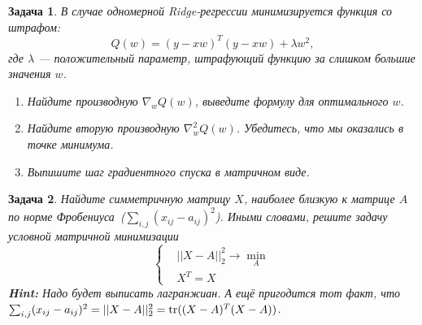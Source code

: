 \documentclass[12pt,fleqn]{article}
\newtheorem{esProblem}{Задача}
\begin{document}
\begin{esProblem}
    В случае одномерной Ridge-регрессии минимизируется функция со штрафом:
    \[
    Q(w) = (y - xw)^T(y - xw) + \lambda w^2,
    \]
    где $\lambda$ — положительный параметр, штрафующий функцию за слишком большие значения $w$.
    
    \begin{enumerate}
        \item Найдите производную $\nabla_w Q(w)$, выведите формулу для оптимального $w$.
        \item Найдите вторую производную $\nabla_w^2 Q(w)$. Убедитесь, что мы оказались в точке минимума. 
        \item Выпишите шаг градиентного спуска в матричном виде.
    \end{enumerate}
\end{esProblem}

\begin{esProblem}
    Найдите симметричную матрицу $X$, наиболее близкую к матрице $A$ по норме Фробениуса~($\sum_{i,j} (x_{ij} - a_{ij})^2$).
    Иными словами, решите задачу условной матричной минимизации 
    \begin{equation*}
    \begin{cases}
    &||X - A||_2^2 \to \min_{A}  \\
    &X^T = X
    \end{cases}
    \end{equation*}
    \textbf{Hint:} Надо будет выписать лагранжиан.  А ещё пригодится тот факт, что $\sum_{i,j} (x_{ij} - a_{ij})^2 = ||X - A||_2^2 =  \mathop{\mathrm{tr}}((X-A)^T (X-A))$.
\end{esProblem}
\end{document}
